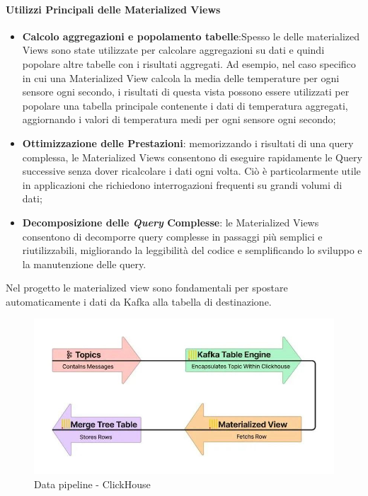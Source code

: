 \paragraph{Utilizzi Principali delle Materialized Views}
\begin{itemize}
    \item \textbf{Calcolo aggregazioni e popolamento tabelle}:Spesso le delle materialized Views sono state utilizzate per calcolare aggregazioni su dati e quindi popolare altre tabelle con i risultati aggregati. Ad esempio, nel caso specifico in cui una Materialized View calcola la media delle temperature per ogni sensore ogni secondo, i risultati di questa vista possono essere utilizzati per popolare una tabella principale contenente i dati di temperatura aggregati, aggiornando i valori di temperatura medi per ogni sensore ogni secondo;
    \item \textbf{Ottimizzazione delle Prestazioni}: memorizzando i risultati di una query complessa, le Materialized Views consentono di eseguire rapidamente le Query successive senza dover ricalcolare i dati ogni volta. Ciò è particolarmente utile in applicazioni che richiedono interrogazioni frequenti su grandi volumi di dati;
    \item \textbf{Decomposizione delle \textit{Query} Complesse}: le Materialized Views consentono di decomporre query complesse in passaggi più semplici e riutilizzabili, migliorando la leggibilità del codice e semplificando lo sviluppo e la manutenzione delle query.
\end{itemize}

Nel progetto le materialized view sono fondamentali per spostare automaticamente i dati da Kafka alla tabella di destinazione.
\begin{figure}[H]
  \centering
  \includegraphics[width=1\textwidth]{../Images/SpecificaTecnica/enginePipeline.jpg}
  \caption{Data pipeline - ClickHouse}
  \label{fig:datapip}
\end{figure}

